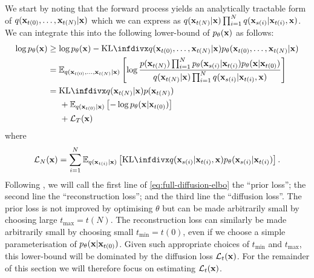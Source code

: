 We start by noting that the forward process yields an analytically tractable form of $q({\mathbf{x}}_{t(0)},\ldots,{\mathbf{x}}_{t(N)}|{\mathbf{x}})$ which we can express as $q({\mathbf{x}}_{t(N)}|{\mathbf{x}}) \prod_{i=1}^N q({\mathbf{x}}_{s(i)} | {\mathbf{x}}_{t(i)}, {\mathbf{x}})$. We can integrate this into the following lower-bound of $p_\theta({\mathbf{x}})$ as follows:
\begin{align}
    \log p_\theta(\rvx) &\geq \log p_\theta(\rvx) - \kl{q(\rvx_{t(0)},\ldots,\rvx_{t(N)}|\rvx)}{p_\theta(\rvx_{t(0)},\ldots,\rvx_{t(N)}|\rvx)} \\
    &= \EX_{q(\rvx_{t(0)},\ldots,\rvx_{t(N)}|\rvx)} \left[ \log \frac{p(\rvx_{t(N)}) \prod_{i=1}^N p_\theta(\rvx_{s(i)} | \rvx_{t(i)}) p_\theta(\rvx|\rvx_{t(0)}) }{q(\rvx_{t(N)}|\rvx) \prod_{i=1}^N q(\rvx_{s(i)} | \rvx_{t(i)}, \rvx)} \right] \\
    &= \kl{q(\rvx_{t(N)}|\rvx)}{p(\rvx_{t(N)})} \nonumber\\
    &\hspace{5mm} + \EX_{q(\rvx_{t(0)}|\rvx)} \left[ - \log p_\theta(\rvx|\rvx_{t(0)}) \right] \nonumber\\
    &\hspace{5mm} + \mathcal{L}_T(\rvx) \label{eq:full-diffusion-elbo}
\end{align}
where
\begin{align}
    \mathcal{L}_N(\rvx) = \sum_{i=1}^N \EX_{q(\rvx_{t(i)}|\rvx)} \left[ \kl{q(\rvx_{s(i)} | \rvx_{t(i)}, \rvx)}{p_\theta(\rvx_{s(i)} | \rvx_{t(i)})} \right].
\end{align}
Following \citet{kingma2021variational}, we will call the first line of \cref{eq:full-diffusion-elbo} the ``prior loss''; the second line the ``reconstruction loss''; and the third line the ``diffusion loss''. The prior loss is not improved by optimising $\theta$ but can be made arbitrarily small by choosing large $t_\text{max}=t(N)$. The reconstruction loss can similarly be made arbitrarily small by choosing small $t_\text{min}=t(0)$, even if we choose a simple parameterisation of $p_\theta({\mathbf{x}}|{\mathbf{x}}_{t(0)})$. Given such appropriate choices of $t_\text{min}$ and $t_\text{max}$, this lower-bound will be dominated by the diffusion loss $\mathcal{L}_t({\mathbf{x}})$. For the remainder of this section we will therefore focus on estimating $\mathcal{L}_t({\mathbf{x}})$.

